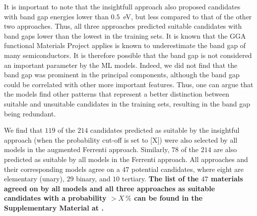 \documentclass[superscriptaddress,unsortedaddress,
 amsmath,amssymb,
 aps,
]{revtex4-2}
\newcommand{\oliver}[1]{\textcolor{violet}{#1}}
\begin{document}
It is important to note that the insightfull approach also proposed candidates with band gap energies lower than $0.5$~eV, but less compared to that of the other two approaches. Thus, all three approaches predicted suitable candidates with band gaps lower than the lowest in the training sets. 
It is known that the GGA functional Materials Project applies is known to underestimate the band gap of many semiconductors. 
It is therefore possible that the band gap is not considered an important parameter by the ML models. 
Indeed, we did not find that the band gap was prominent in the principal components, although the band gap could be correlated with other more important features. 
Thus, one can argue that the models find other patterns that represent a better distinction between suitable and unsuitable candidates in the training sets, resulting in the band gap being redundant.

We find that $119$ of the $214$ candidates predicted as suitable by the insightful approach (when the probability cut-off is set to [X]) were also selected by all models in the augmented Ferrenti approach. 
Similarly, $78$ of the $214$ are also predicted as suitable by all models in the Ferrenti approach. All approaches and their corresponding models agree on a $47$ potential candidates, where eight are elementary (unary), $29$ binary, and $10$ tertiary.
\textbf{The list of the $47$ materials agreed on by all models and all three approaches as suitable candidates with a probability $> X \ \%$ can be found in the Supplementary Material at \cite{supplementary}.} 



\end{document}
